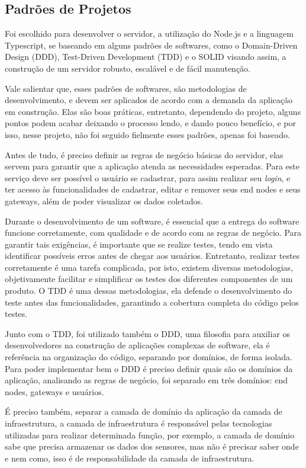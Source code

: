 \subsection{Padrões de Projetos}
\label{metod:servidor:padroes}
Foi escolhido para desenvolver o servidor, a utilização do Node.js e a linguagem Typescript, se baseando em alguns padrões de softwares, como o Domain-Driven Design (DDD), Test-Driven Development (TDD) e o SOLID visando assim, a construção de um servidor robusto, escalável e de fácil manutenção.

Vale salientar que, esses padrões de softwares, são metodologias de desenvolvimento, e devem ser aplicados de acordo com a demanda da aplicação em construção. Elas são boas práticas, entretanto, dependendo do projeto, alguns pontos podem acabar deixando o processo lendo, e dando pouco benefício, e por isso, nesse projeto, não foi seguido fielmente esses padrões, apenas foi baseado.

Antes de tudo, é preciso definir as regras de negócio básicas do servidor, elas servem para garantir que a aplicação atenda as necessidades esperadas. Para este serviço deve ser possível o usuário se cadastrar, para assim realizar seu \textit{login}, e ter acesso às funcionalidades de cadastrar, editar e remover seus end nodes e seus gateways, além de poder visualizar os dados coletados.

Durante o desenvolvimento de um software, é essencial que a entrega do software funcione corretamente, com qualidade e de acordo com as regras de negócio. Para garantir tais exigências, é importante que se realize testes, tendo em vista identificar possíveis erros antes de chegar aos usuários. Entretanto, realizar testes corretamente é uma tarefa complicada, por isto, existem diversas metodologias, objetivamente facilitar e simplificar os testes dos diferentes componentes de um produto. O TDD é uma dessas metodologias, ela defende o desenvolvimento do teste antes das funcionalidades, garantindo a cobertura completa do código pelos testes.

Junto com o TDD, foi utilizado também o DDD, uma filosofia para auxiliar os desenvolvedores na construção de aplicações complexas de software, ela é referência na organização do código, separando por domínios, de forma isolada. Para poder implementar bem o DDD é preciso definir quais são os domínios da aplicação, analisando as regras de negócio, foi separado em três domínios: end nodes, gateways e usuários.

É preciso também, separar a camada de domínio da aplicação da camada de infraestrutura, a camada de infraestrutura é responsável pelas tecnologias utilizadas para realizar determinada função, por exemplo, a camada de domínio sabe que precisa armazenar os dados dos sensores, mas não é precisar saber onde e nem como, isso é de responsabilidade da camada de infraestrutura.

